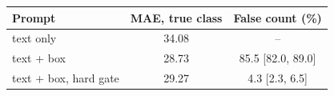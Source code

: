 \begin{tabular}{@{}lcc@{}}
\toprule
Prompt & MAE, true class & False count (\%) \\
\midrule
text only & 34.08 & -- \\
text + box & 28.73 & 85.5 {\scriptsize[82.0, 89.0]} \\
text + box, hard gate & 29.27 & 4.3 {\scriptsize[2.3, 6.5]} \\
\bottomrule
\end{tabular}
